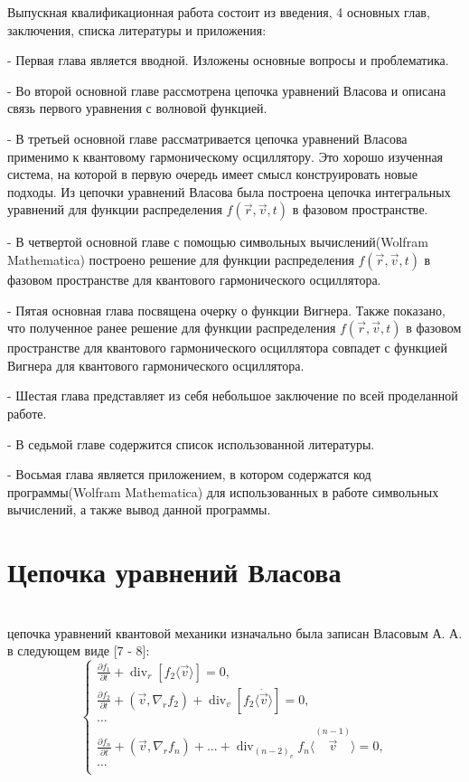 \documentclass[a4paper,14pt]{article}
\begin{document}
Выпускная квалификационная работа состоит из введения, 4 основных глав, заключения, списка литературы и приложения:

- Первая глава является вводной. Изложены основные вопросы и проблематика.

- Во второй основной главе рассмотрена цепочка уравнений Власова и описана связь первого уравнения с волновой функцией.

- В третьей основной главе рассматривается цепочка уравнений Власова применимо к квантовому гармоническому осциллятору. Это хорошо изученная система, на которой в первую очередь имеет смысл конструировать новые подходы. Из цепочки уравнений Власова была построена цепочка интегральных уравнений для функции распределения $f(\vec r, \vec v,t)$ в фазовом пространстве.

- В четвертой основной главе с помощью символьных вычислений(Wolfram Mathematica) построено решение для функции распределения $f(\vec r, \vec v,t)$ в фазовом пространстве для квантового гармонического осциллятора. 

- Пятая основная глава посвящена очерку о функции Вигнера. Также показано, что полученное ранее решение для функции распределения $f(\vec r, \vec v,t)$ в фазовом пространстве для квантового гармонического осциллятора совпадет с функцией Вигнера для квантового гармонического осциллятора. 

- Шестая глава представляет из себя небольшое заключение по всей проделанной работе.

- В седьмой главе содержится список использованной литературы.

- Восьмая глава является приложением, в котором содержатся код программы(Wolfram Mathematica) для использованных в работе символьных вычислений, а также вывод данной программы.

\newpage
\section{Цепочка уравнений Власова}
~\\
 цепочка уравнений квантовой механики изначально была записан Власовым А. А. в следующем виде [7 - 8]:
\begin{equation} 
\begin{cases}
\frac{\partial f_1}{\partial t} + \operatorname{div}_r[f_2 \langle\vec v\rangle] = 0, \\
\frac{\partial f_2}{\partial t} + (\vec v, \nabla_r f_2) + \operatorname{div}_{v}\left[f_{2}\langle\dot{\vec{v}}\rangle\right]= 0,\\
... \\
\frac{\partial f_n}{\partial t} + (\vec v, \nabla_r f_n) + ... + \operatorname{div}_{{(n-2)}_v}  f_{n}\langle\stackrel{(n-1)}{\vec{v}}\rangle = 0,\\
...\\
\end{cases}
\end{equation}
\end{document}
